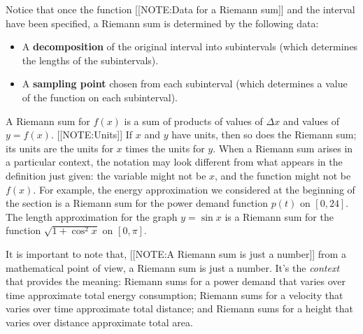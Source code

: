 Notice that once the function 
[[NOTE:Data for a  Riemann sum]]
and the interval have been specified, a Riemann sum is determined by
the following data:
\begin{itemize}

\item A {\bf decomposition} of the original interval into subintervals
  (which determines the lengths of the subintervals).

\item A {\bf sampling point}  chosen from each
  subinterval (which determines a value of the function on each
  subinterval).

\end{itemize}


A Riemann sum for $f(x)$ is a sum of products of values of $\Delta x$
and values of $y = f(x)$.
[[NOTE:Units]]
If $x$ and $y$ have units, then so does the Riemann sum; its units are
the units for $x$ times the units for $y$.  When a Riemann sum arises
in a particular context, the notation may look different from what
appears in the definition just given: the variable might not be $x$,
and the function might not be $f(x)$.  For example, the energy
approximation we considered at the beginning of the section is a
Riemann sum for the power demand function $p(t)$ on $[0, 24]$.  The
length approximation for the graph $y = \sin{x}$ is a Riemann sum for
the function $\sqrt{1 + \cos^2{x}} $ on $[0, \pi]$.

It is important to note that, 
[[NOTE:A Riemann sum  is just a number]]
from a mathematical point of view, a Riemann sum is just a number.
It's the {\it context\/} that provides the meaning: Riemann sums for a
power demand that varies over time approximate total energy
consumption; Riemann sums for a velocity that varies over time
approximate total distance; and Riemann sums for a height that varies
over distance approximate total area.

